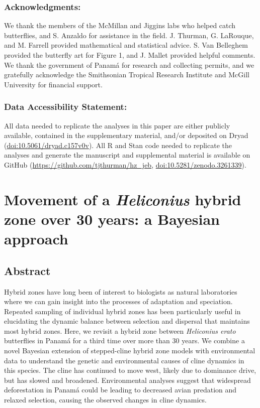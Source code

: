 \documentclass[]{article}
\begin{document}
\subsubsection{Acknowledgments:}\label{acknowledgments}

We thank the members of the McMillan and Jiggins labs who helped catch
butterflies, and S. Anzaldo for assistance in the field. J. Thurman, G.
LaRouque, and M. Farrell provided mathematical and statistical advice.
S. Van Belleghem provided the butterfly art for Figure 1, and J. Mallet
provided helpful comments. We thank the government of Panamá for
research and collecting permits, and we gratefully acknowledge the
Smithsonian Tropical Research Institute and McGill University for
financial support.

\subsubsection{Data Accessibility
Statement:}\label{data-accessibility-statement}

All data needed to replicate the analyses in this paper are either
publicly available, contained in the supplementary material, and/or
deposited on Dryad (\url{doi:10.5061/dryad.c157v0v}). All R and Stan
code needed to replicate the analyses and generate the manuscript and
supplemental material is available on GitHub
(\url{https://github.com/tjthurman/hz_jeb},
\url{doi:10.5281/zenodo.3261339}).

\pagebreak
{}

\linenumbers

\section{\texorpdfstring{Movement of a \textit{Heliconius} hybrid zone
over 30 years: a Bayesian
approach}{Movement of a  hybrid zone over 30 years: a Bayesian approach}}\label{movement-of-a-hybrid-zone-over-30-years-a-bayesian-approach-1}

\subsection{Abstract}\label{abstract}

Hybrid zones have long been of interest to biologists as natural
laboratories where we can gain insight into the processes of adaptation
and speciation. Repeated sampling of individual hybrid zones has been
particularly useful in elucidating the dynamic balance between selection
and dispersal that maintains most hybrid zones. Here, we revisit a
hybrid zone between \textit{Heliconius erato} butterflies in Panamá for
a third time over more than 30 years. We combine a novel Bayesian
extension of stepped-cline hybrid zone models with environmental data to
understand the genetic and environmental causes of cline dynamics in
this species. The cline has continued to move west, likely due to
dominance drive, but has slowed and broadened. Environmental analyses
suggest that widespread deforestation in Panamá could be leading to
decreased avian predation and relaxed selection, causing the observed
changes in cline dynamics.
\end{document}

